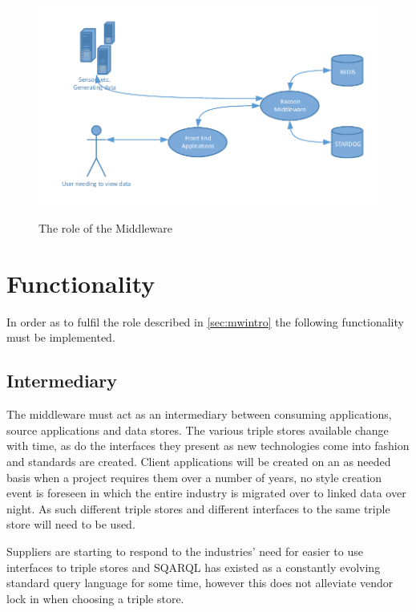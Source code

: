  \begin{figure}[!h]
\myfloatalign
{\includegraphics[width=\linewidth]{gfx/Middleware}} 
\caption{The role of the Middleware}
\label{fig:MiddlewareHighLevel}
\end{figure}

\section{Functionality}

In order as to fulfil the role described in \autoref{sec:mwintro} the following functionality must be implemented. 

\subsection {Intermediary}
The middleware must act as an intermediary between consuming applications, source applications and data stores. The various triple stores available change with time, as do the interfaces they present as new technologies come into fashion and standards are created. Client applications will be created on an as needed basis when a project requires them over a number of years, no  style creation event is foreseen in which the entire industry is migrated over to linked data over night. As such different triple stores and different interfaces to the same triple store will need to be used. 

Suppliers are starting to respond to the industries' need for easier to use interfaces to triple stores and SQARQL has existed as a constantly evolving standard query language for some time, however this does not alleviate vendor lock in when choosing a triple store. 

